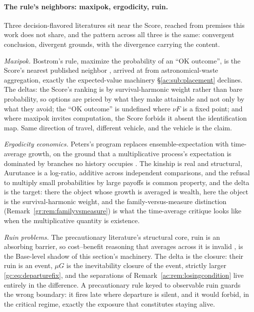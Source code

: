 \documentclass[11pt]{article}
\numberwithin{equation}{section}
\theoremstyle{plain}
\theoremstyle{definition}
\theoremstyle{remark}
\begin{document}
\paragraph{The rule's neighbors: maxipok, ergodicity, ruin.}\label{gs:rem:ruleneighbors}
Three decision-flavored literatures sit near the Score, reached from
premises this work does not share, and the pattern across all three is
the same: convergent conclusion, divergent grounds, with the divergence
carrying the content.

\emph{Maxipok.} Bostrom's rule, maximize the probability of an
``OK outcome'', is the Score's nearest published neighbor
\cite{Bos03}, arrived at from astronomical-waste aggregation, exactly
the expected-value machinery \S\ref{ac:sub:placement} declines. The
deltas: the Score's ranking is by survival-harmonic weight rather than
bare probability, so options are priced by what they make attainable
and not only by what they avoid; the ``OK outcome'' is undefined where
$\nu F$ is a fixed point; and where maxipok invites computation, the
Score forbids it absent the identification map. Same direction of
travel, different vehicle, and the vehicle is the claim.

\emph{Ergodicity economics.} Peters's program replaces
ensemble-expectation with time-average growth, on the ground that a
multiplicative process's expectation is dominated by branches no
history occupies \cite{Peters19}. The kinship is real and structural, Aurutance is a log-ratio, additive across independent comparisons,
and the refusal to multiply small probabilities by large payoffs is
common property, and the delta is the target: there the object
whose growth is averaged is wealth, here the object is the
survival-harmonic weight, and the family-versus-measure distinction
(Remark~\ref{gr:rem:familyvsmeasure}) is what the time-average
critique looks like when the multiplicative quantity is existence.

\emph{Ruin problems.} The precautionary literature's structural core, ruin is an absorbing barrier, so cost--benefit reasoning that
averages across it is invalid \cite{TRDNB14, Tal12}, is the
Base-level shadow of this section's machinery. The delta is the
closure: their ruin is an event, $\mu G$ is the inevitability closure
of the event, strictly larger \eqref{gc:eq:departurefix}, and the
separations of Remark~\ref{ac:rem:losingcondition} live entirely in
the difference. A precautionary rule keyed to observable ruin guards
the wrong boundary: it fires late where departure is silent, and it
would forbid, in the critical regime, exactly the exposure that
constitutes staying alive.
\end{document}
